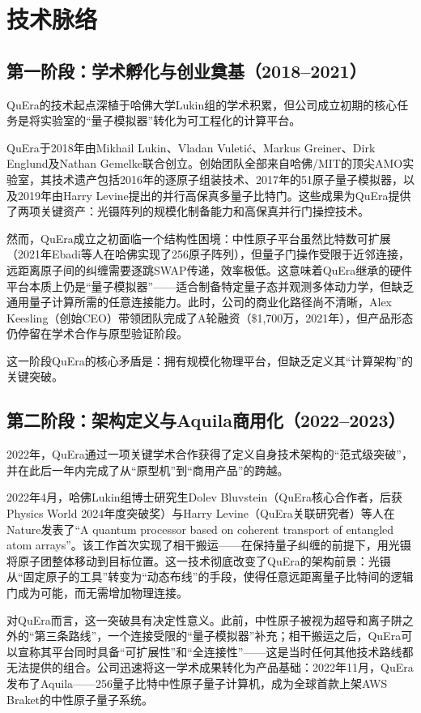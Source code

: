 \documentclass[11pt,a4paper]{ctexart}
\begin{document}
\section{技术脉络}

\subsection{第一阶段：学术孵化与创业奠基（2018--2021）}

QuEra的技术起点深植于哈佛大学Lukin组的学术积累，但公司成立初期的核心任务是将实验室的``量子模拟器''转化为可工程化的计算平台。

QuEra于2018年由Mikhail Lukin、Vladan Vuleti\'c、Markus Greiner、Dirk Englund及Nathan Gemelke联合创立。创始团队全部来自哈佛/MIT的顶尖AMO实验室，其技术遗产包括2016年的逐原子组装技术、2017年的51原子量子模拟器，以及2019年由Harry Levine提出的并行高保真多量子比特门。这些成果为QuEra提供了两项关键资产：光镊阵列的规模化制备能力和高保真并行门操控技术。

然而，QuEra成立之初面临一个结构性困境：中性原子平台虽然比特数可扩展（2021年Ebadi等人在哈佛实现了256原子阵列），但量子门操作受限于近邻连接，远距离原子间的纠缠需要逐跳SWAP传递，效率极低。这意味着QuEra继承的硬件平台本质上仍是``量子模拟器''——适合制备特定量子态并观测多体动力学，但缺乏通用量子计算所需的任意连接能力。此时，公司的商业化路径尚不清晰，Alex Keesling（创始CEO）带领团队完成了A轮融资（\$1,700万，2021年），但产品形态仍停留在学术合作与原型验证阶段。

这一阶段QuEra的核心矛盾是：拥有规模化物理平台，但缺乏定义其``计算架构''的关键突破。

\subsection{第二阶段：架构定义与Aquila商用化（2022--2023）}

2022年，QuEra通过一项关键学术合作获得了定义自身技术架构的``范式级突破''，并在此后一年内完成了从``原型机''到``商用产品''的跨越。

2022年4月，哈佛Lukin组博士研究生Dolev Bluvstein（QuEra核心合作者，后获Physics World 2024年度突破奖）与Harry Levine（QuEra关联研究者）等人在Nature发表了``A quantum processor based on coherent transport of entangled atom arrays''。该工作首次实现了相干搬运——在保持量子纠缠的前提下，用光镊将原子团整体移动到目标位置。这一技术彻底改变了QuEra的架构前景：光镊从``固定原子的工具''转变为``动态布线''的手段，使得任意远距离量子比特间的逻辑门成为可能，而无需增加物理连接。

对QuEra而言，这一突破具有决定性意义。此前，中性原子被视为超导和离子阱之外的``第三条路线''，一个连接受限的``量子模拟器''补充；相干搬运之后，QuEra可以宣称其平台同时具备``可扩展性''和``全连接性''——这是当时任何其他技术路线都无法提供的组合。公司迅速将这一学术成果转化为产品基础：2022年11月，QuEra发布了Aquila——256量子比特中性原子量子计算机，成为全球首款上架AWS Braket的中性原子量子系统。
\end{document}

